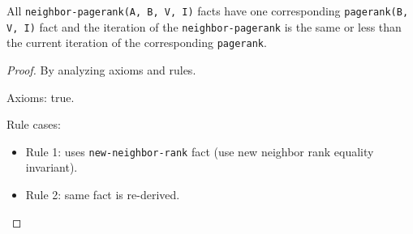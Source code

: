 \begin{invariant}
All \texttt{neighbor-pagerank(A, B, V, I)} facts have one corresponding
\texttt{pagerank(B, V, I)} fact and the iteration of the \texttt{neighbor-pagerank}
is the same or less than the current iteration of the corresponding
\texttt{pagerank}.
\end{invariant}
\begin{proof}
By analyzing axioms and rules.

Axioms: true.

Rule cases:

\begin{itemize}
   \item Rule 1: uses \texttt{new-neighbor-rank} fact (use new neighbor rank
         equality invariant).
   \item Rule 2: same fact is re-derived.
\end{itemize}
\end{proof}

